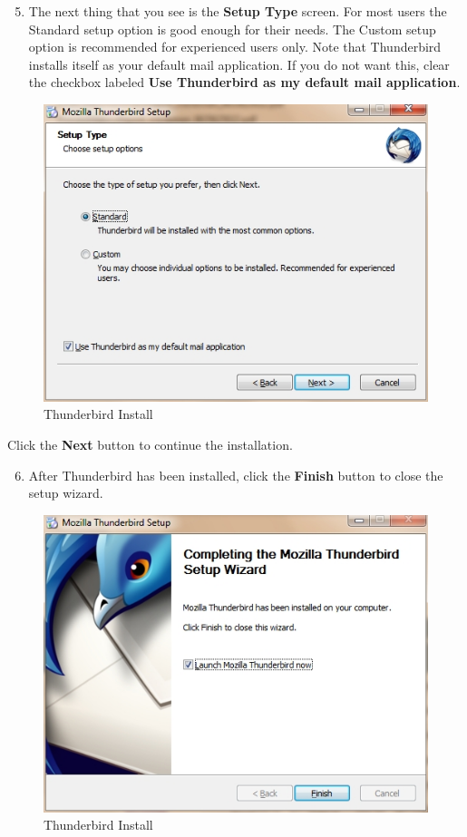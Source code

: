 \begin{enumerate}[1.]
\setcounter{enumi}{4}
\item
  The next thing that you see is the \textbf{Setup Type} screen. For
  most users the Standard setup option is good enough for their needs.
  The Custom setup option is recommended for experienced users only.
  Note that Thunderbird installs itself as your default mail
  application. If you do not want this, clear the checkbox labeled
  \textbf{Use Thunderbird as my default mail application}.
\end{enumerate}
\begin{figure}[htbp]
\centering
\includegraphics{thunderbird_inst_4.jpg}
\caption{Thunderbird Install}
\end{figure}

Click the \textbf{Next} button to continue the installation.

\begin{enumerate}[1.]
\setcounter{enumi}{5}
\item
  After Thunderbird has been installed, click the \textbf{Finish} button
  to close the setup wizard.
\end{enumerate}
\begin{figure}[htbp]
\centering
\includegraphics{thunderbird_inst_5.jpg}
\caption{Thunderbird Install}
\end{figure}

